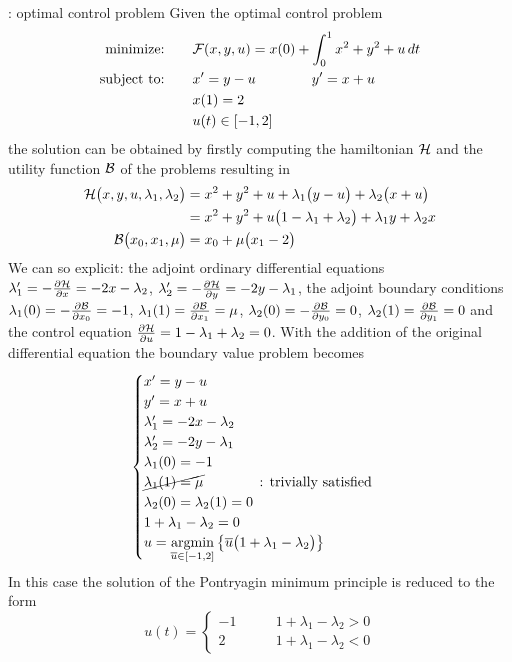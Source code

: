 \begin{example}{: optimal control problem}
	Given the optimal control problem
	\begin{align*}
		\textrm{minimize:} \qquad & \mathcal{F} (x,y,u) = x(0) + \int_0^1 x^2 + y^2 + u \, dt   \\
		\textrm{subject to:} \qquad & x' = y - u \qquad \qquad y' = x+u \\
		&x(1) = 2 \\ & u(t) \in [-1,2]
	\end{align*}
	the solution can be obtained by firstly computing the hamiltonian $\mathcal{H}$ and the utility function $\mathcal{B}$ of the problems resulting in
	\begin{align*}
		\mathcal{H}\big(x,y,u,\lambda_1,\lambda_2\big) & = x^2 + y^2 + u + \lambda_1 \big(y-u\big) + \lambda_2 \big(x + u\big) \\
		& = x^2 + y^2 + u \big(1 - \lambda_1 + \lambda_2\big) + \lambda_1 y + \lambda_2 x \\
		\mathcal{B}\big(x_0,x_1, \mu\big) & = x_0 + \mu \big( x_1 - 2\big)
	\end{align*}
	We can so explicit: the adjoint ordinary differential equations $\lambda_1' = -\frac{\partial \mathcal{H}}{\partial x} = - 2x - \lambda_2$, $\lambda_2' = -\frac{\partial \mathcal{H}}{\partial y} = -2y - \lambda_1$, the adjoint boundary conditions $\lambda_1(0) = - \frac{\partial \mathcal{B}}{\partial x_0} = - 1$, $\lambda_1(1) = \frac{\partial \mathcal{B}}{\partial x_1} = \mu $, $\lambda_2(0) = -\frac{\partial \mathcal{B}}{\partial y_0} = 0$, $\lambda_2(1) = \frac{\partial \mathcal{B}}{\partial y_1} = 0$ and the control equation $\frac{\partial \mathcal{H}}{\partial u} = 1 - \lambda_1 + \lambda_2 = 0$. With the addition of the original differential equation the boundary value problem becomes
	\[ \begin{cases}
		x' = y - u \\ y' = x+u \\
		\lambda_1' = -2x - \lambda_2 \\ \lambda_2' = -2y - \lambda_1 \\
		\lambda_1(0) = -1 \\ \cancel{\lambda_1(1) = \mu} \qquad \qquad \textrm{: trivially satisfied} \\
		\lambda_2(0) = \lambda_2(1) = 0 \\
		1 + \lambda_1 - \lambda_2 = 0 \\
		u = \underset{\overline u \in [-1,2]}{\textrm{argmin}} \left\{ \overline u \big(1 + \lambda_1 - \lambda_2\big)  \right\}
	\end{cases} \]
	In this case the solution of the Pontryagin minimum principle is reduced to the form
	\[ u(t) = \begin{cases}
		-1 \qquad & 1 + \lambda_1 - \lambda_2 > 0 \\
		2 & 1 + \lambda_1 - \lambda_2 < 0
	\end{cases} \]
	
\end{example}

